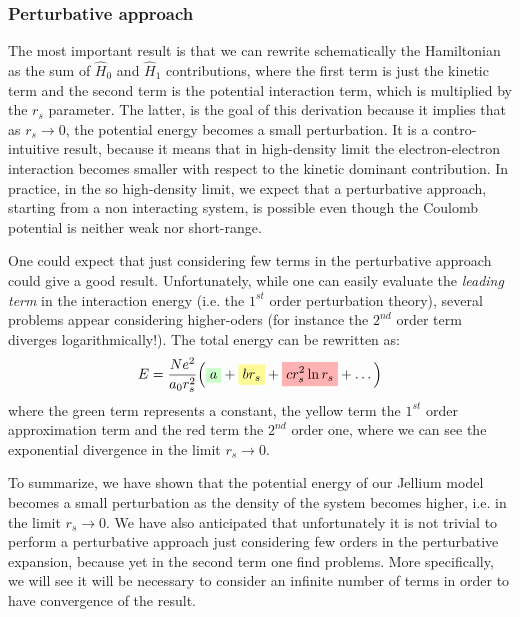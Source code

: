 \documentclass[../main/main.tex]{subfiles}
\begin{document}
\subsubsection{Perturbative approach}

The most important result is that we can rewrite schematically the Hamiltonian as the sum of \( \hat{H}_0  \)  and \( \hat{H}_1  \) contributions, where the first term is just the kinetic term and the second term is  the potential interaction term, which is multiplied by the \( r_s \) parameter. The latter, is the goal of this derivation because it implies that as \( r_s \rightarrow 0 \), the potential energy becomes a small perturbation. It is a contro-intuitive result, because it means that in high-density limit the electron-electron interaction becomes smaller with respect to the kinetic dominant contribution.  
In practice, in the so high-density limit, we expect that a perturbative approach, starting from a non interacting system, is possible even though the Coulomb potential is neither weak nor short-range.

One could expect that just considering few terms in the perturbative approach could give a good result. Unfortunately, while one can easily evaluate the \emph{leading term} in the interaction energy (i.e. the \( 1^{st} \) order perturbation theory), several problems appear considering higher-oders (for instance the \( 2^{nd} \) order term diverges logarithmically!).
The total energy can be rewritten as: 
\begin{equation}
  E = \frac{N e^2}{a_0 r_s^2} \qty(\mathcolorbox{green!20}{a} + \mathcolorbox{yellow!40}{b r_s} + \mathcolorbox{red!30}{c r_s^2 \ln{r_s}} + \dots )
  \label{eq:5_1}
\end{equation}
where the green term represents a constant, the yellow term the \( 1^{st} \) order approximation term and the red term the \( 2^{nd} \) order one, where we can see the exponential divergence in the limit \( r_s \rightarrow 0 \).

To summarize, we have shown that the potential energy of our Jellium model becomes a small perturbation as the density of the system becomes higher, i.e. in the limit \( r_s \rightarrow 0  \). We have also anticipated that unfortunately it is not trivial to perform a perturbative approach just considering few orders in the perturbative expansion, because yet in the second term one find problems. More specifically, we will see it will be necessary to consider an infinite number of terms in order to have convergence of the result.
\end{document}
